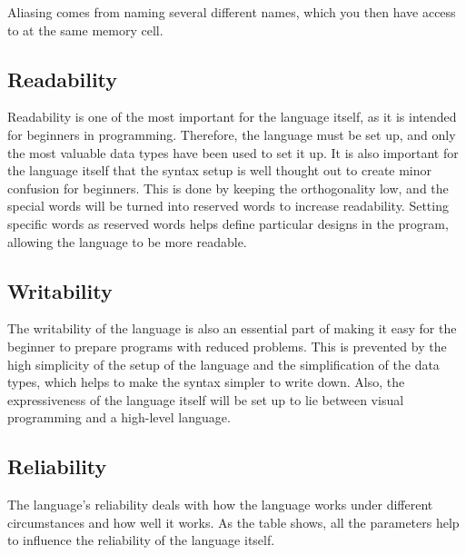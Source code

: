 Aliasing comes from naming several different names, which you then have access to at the same memory cell.




\subsection{Readability}
Readability is one of the most important for the language itself, as it is intended for beginners in programming. 
Therefore, the language must be set up, and only the most valuable data types have been used to set it up. It is also important for the language itself that the syntax setup is well thought out to create minor confusion for beginners.
 This is done by keeping the orthogonality low, and the special words will be turned into reserved words to increase readability. 
Setting specific words as reserved words helps define particular designs in the program, allowing the language to be more readable.

\subsection{Writability}

The writability of the language is also an essential part of making it easy for the beginner to prepare programs with reduced problems. 
This is prevented by the high simplicity of the setup of the language and the simplification of the data types, which helps to make the syntax simpler to write down.
 Also, the expressiveness of the language itself will be set up to lie between visual programming and a high-level language.

 \subsection{Reliability}
 The language's reliability deals with how the language works under different circumstances and how well it works. 
 As the table shows, all the parameters help to influence the reliability of the language itself.
